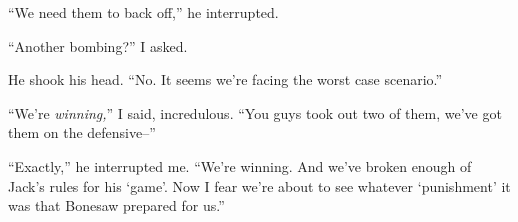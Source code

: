 ``We need them to back off,'' he interrupted.



``Another bombing?''  I asked.



He shook his head.  ``No.  It seems we're facing the worst case scenario.''



``We're \emph{winning,}'' I said, incredulous.  ``You guys took out two of them, we've got them on the defensive--''



``Exactly,'' he interrupted me.  ``We're winning.  And we've broken enough of Jack's rules for his `game'.  Now I fear we're about to see whatever `punishment' it was that Bonesaw prepared for us.''





